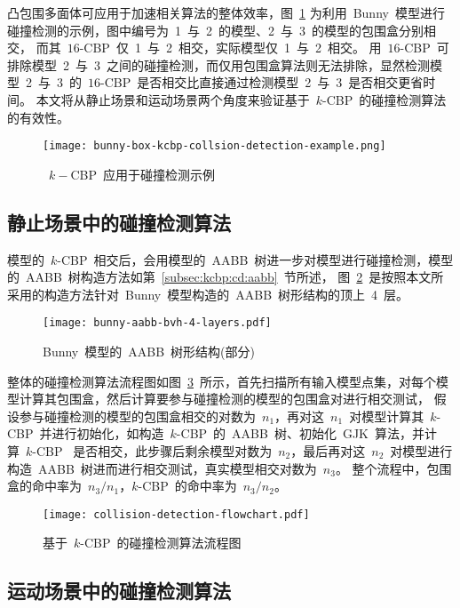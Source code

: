 凸包围多面体可应用于加速相关算法的整体效率，图~\ref{lbl:bunny-box-kcbp-collsion-detection-example}
为利用~Bunny~模型进行碰撞检测的示例，图中编号为~1~与~2~的模型、2~与~3~的模型的包围盒分别相交， 而其~$16$-CBP~仅~1~与~2~相交，实际模型仅~1~与~2~相交。
用~$16$-CBP~可排除模型~2~与~3~之间的碰撞检测，而仅用包围盒算法则无法排除，显然检测模型~2~与~3~的~$16$-CBP~是否相交比直接通过检测模型~2~与~3~是否相交更省时间。
本文将从静止场景和运动场景两个角度来验证基于~$k$-CBP~的碰撞检测算法的有效性。 

\begin{figure}[htbp] 
\centering
\texttt{[image: bunny-box-kcbp-collsion-detection-example.png]}
\caption{~$k-$CBP~应用于碰撞检测示例}
\label{lbl:bunny-box-kcbp-collsion-detection-example}
\end{figure}

\subsection{静止场景中的碰撞检测算法}
\label{subsec:static:cd}

模型的~$k$-CBP~相交后，会用模型的~AABB~树进一步对模型进行碰撞检测，模型的~AABB~树构造方法如第~\ref{subsec:kcbp:cd:aabb}~节所述，
图~\ref{fig:bunny:aabb:bvh:toplayer4}~是按照本文所采用的构造方法针对~Bunny~模型构造的~AABB~树形结构的顶上~4~层。

\begin{figure}[htpb]
  \centering
  \texttt{[image: bunny-aabb-bvh-4-layers.pdf]}
  \caption{Bunny~模型的~AABB~树形结构(部分)}
  \label{fig:bunny:aabb:bvh:toplayer4}
\end{figure}

整体的碰撞检测算法流程图如图~\ref{fig:flowchart:cd}~所示，首先扫描所有输入模型点集，对每个模型计算其包围盒，然后计算要参与碰撞检测的模型的包围盒对进行相交测试，
假设参与碰撞检测的模型的包围盒相交的对数为~$n_1$，再对这~$n_1$~对模型计算其~$k$-CBP~并进行初始化，如构造~$k$-CBP~的~AABB~树、初始化~GJK~算法，并计算~$k$-CBP~
是否相交，此步骤后剩余模型对数为~$n_2$，最后再对这~$n_2$~对模型进行构造~AABB~树进而进行相交测试，真实模型相交对数为~$n_3$。
整个流程中，包围盒的命中率为~$n_3 / n_1$，$k$-CBP~的命中率为~$n_3/n_2$。

\begin{figure}[htpb]
  \centering
  \texttt{[image: collision-detection-flowchart.pdf]}
  \caption{基于~$k$-CBP~的碰撞检测算法流程图}
  \label{fig:flowchart:cd}
\end{figure}

\subsection{运动场景中的碰撞检测算法}
\label{subsec:moving:cd}

